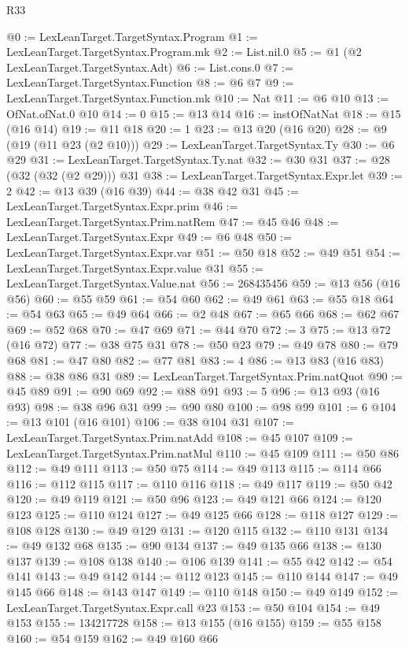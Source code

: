 \begin{lexlean}{R33}
\begin{coremodule}
@0 := LexLeanTarget.TargetSyntax.Program
@1 := LexLeanTarget.TargetSyntax.Program.mk
@2 := List.nil.{0}
@5 := @1 (@2 LexLeanTarget.TargetSyntax.Adt)
@6 := List.cons.{0}
@7 := LexLeanTarget.TargetSyntax.Function
@8 := @6 @7
@9 := LexLeanTarget.TargetSyntax.Function.mk
@10 := Nat
@11 := @6 @10
@13 := OfNat.ofNat.{0} @10
@14 := 0
@15 := @13 @14
@16 := instOfNatNat
@18 := @15 (@16 @14)
@19 := @11 @18
@20 := 1
@23 := @13 @20 (@16 @20)
@28 := @9 (@19 (@11 @23 (@2 @10)))
@29 := LexLeanTarget.TargetSyntax.Ty
@30 := @6 @29
@31 := LexLeanTarget.TargetSyntax.Ty.nat
@32 := @30 @31
@37 := @28 (@32 (@32 (@2 @29))) @31
@38 := LexLeanTarget.TargetSyntax.Expr.let
@39 := 2
@42 := @13 @39 (@16 @39)
@44 := @38 @42 @31
@45 := LexLeanTarget.TargetSyntax.Expr.prim
@46 := LexLeanTarget.TargetSyntax.Prim.natRem
@47 := @45 @46
@48 := LexLeanTarget.TargetSyntax.Expr
@49 := @6 @48
@50 := LexLeanTarget.TargetSyntax.Expr.var
@51 := @50 @18
@52 := @49 @51
@54 := LexLeanTarget.TargetSyntax.Expr.value @31
@55 := LexLeanTarget.TargetSyntax.Value.nat
@56 := 268435456
@59 := @13 @56 (@16 @56)
@60 := @55 @59
@61 := @54 @60
@62 := @49 @61
@63 := @55 @18
@64 := @54 @63
@65 := @49 @64
@66 := @2 @48
@67 := @65 @66
@68 := @62 @67
@69 := @52 @68
@70 := @47 @69
@71 := @44 @70
@72 := 3
@75 := @13 @72 (@16 @72)
@77 := @38 @75 @31
@78 := @50 @23
@79 := @49 @78
@80 := @79 @68
@81 := @47 @80
@82 := @77 @81
@83 := 4
@86 := @13 @83 (@16 @83)
@88 := @38 @86 @31
@89 := LexLeanTarget.TargetSyntax.Prim.natQuot
@90 := @45 @89
@91 := @90 @69
@92 := @88 @91
@93 := 5
@96 := @13 @93 (@16 @93)
@98 := @38 @96 @31
@99 := @90 @80
@100 := @98 @99
@101 := 6
@104 := @13 @101 (@16 @101)
@106 := @38 @104 @31
@107 := LexLeanTarget.TargetSyntax.Prim.natAdd
@108 := @45 @107
@109 := LexLeanTarget.TargetSyntax.Prim.natMul
@110 := @45 @109
@111 := @50 @86
@112 := @49 @111
@113 := @50 @75
@114 := @49 @113
@115 := @114 @66
@116 := @112 @115
@117 := @110 @116
@118 := @49 @117
@119 := @50 @42
@120 := @49 @119
@121 := @50 @96
@123 := @49 @121 @66
@124 := @120 @123
@125 := @110 @124
@127 := @49 @125 @66
@128 := @118 @127
@129 := @108 @128
@130 := @49 @129
@131 := @120 @115
@132 := @110 @131
@134 := @49 @132 @68
@135 := @90 @134
@137 := @49 @135 @66
@138 := @130 @137
@139 := @108 @138
@140 := @106 @139
@141 := @55 @42
@142 := @54 @141
@143 := @49 @142
@144 := @112 @123
@145 := @110 @144
@147 := @49 @145 @66
@148 := @143 @147
@149 := @110 @148
@150 := @49 @149
@152 := LexLeanTarget.TargetSyntax.Expr.call @23
@153 := @50 @104
@154 := @49 @153
@155 := 134217728
@158 := @13 @155 (@16 @155)
@159 := @55 @158
@160 := @54 @159
@162 := @49 @160 @66

\end{coremodule}
\end{lexlean}
